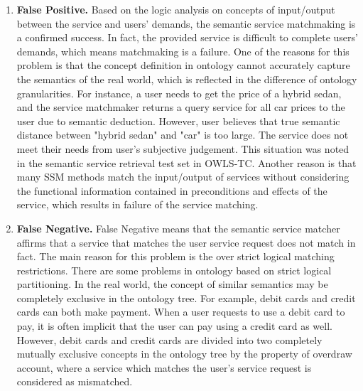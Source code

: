 \documentclass{ieeeaccess}
\begin{document}
\begin{enumerate}
\item\textbf{False Positive.}
Based on the logic analysis on concepts of input/output between the service and users' demands, the semantic service matchmaking is a confirmed success. In fact, the provided service is difficult to complete users' demands, which means matchmaking is a failure. One of the reasons for this problem is that the concept definition in ontology cannot accurately capture the semantics of the real world, which is reflected in the difference of ontology granularities. For instance, a user needs to get the price of a hybrid sedan, and the service matchmaker returns a query service for all car prices to the user due to semantic deduction. However, user believes that true semantic distance between "hybrid sedan" and "car" is too large. The service does not meet their needs from user's subjective judgement. This situation was noted in the semantic service retrieval test set in OWLS-TC. Another reason is that many SSM methods match the input/output of services without considering the functional information contained in preconditions and effects of the service, which results in failure of the service matching.

\item\textbf{False Negative.}
False Negative means that the semantic service matcher affirms that a service that matches the user service request does not match in fact. The main reason for this problem is the over strict logical matching restrictions. There are some problems in ontology based on strict logical partitioning. In the real world, the concept of similar semantics may be completely exclusive in the ontology tree. For example, debit cards and credit cards can both make payment. When a user requests to use a debit card to pay, it is often implicit that the user can pay using a credit card as well. However, debit cards and credit cards are divided into two completely mutually exclusive concepts in the ontology tree by the property of overdraw account, where a service which matches the user's service request is considered as mismatched.
\end{enumerate}
\end{document}
